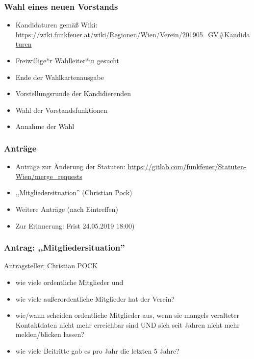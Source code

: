 \documentclass[17pt]{beamer}
\begin{document}
\begin{frame}
	\frametitle{Wahl eines neuen Vorstands}
	\begin{itemize}
		\item Kandidaturen gemäß Wiki: \url{https://wiki.funkfeuer.at/wiki/Regionen/Wien/Verein/201905_GV\#Kandidaturen}
		\item Freiwillige*r Wahlleiter*in gesucht
		\item Ende der Wahlkartenausgabe
		\item Vorstellungsrunde der Kandidierenden
		\item Wahl der Vorstandsfunktionen
		\item Annahme der Wahl
	\end{itemize}
\end{frame}



\begin{frame}
	\frametitle{Anträge}
	\begin{itemize}
		\item Anträge zur Änderung der Statuten: \url{https://gitlab.com/funkfeuer/Statuten-Wien/merge_requests
}
		\item ,,Mitgliedersituation'' (Christian Pock)
		\item Weitere Anträge (nach Eintreffen)
		\item Zur Erinnerung: Frist 24.05.2019 18:00)
	\end{itemize}
\end{frame}



\begin{frame}
	\frametitle{Antrag: ,,Mitgliedersituation''}
	Antragsteller: Christian POCK
	\small{
	\begin{itemize}
		\item wie viele ordentliche Mitglieder und
		\item wie viele außerordentliche Mitglieder hat der Verein?
		\item wie/wann scheiden ordentliche Mitglieder aus, wenn sie mangels veralteter Kontaktdaten nicht mehr erreichbar sind UND sich seit Jahren nicht mehr melden/blicken lassen?
		\item wie viele Beitritte gab es pro Jahr die letzten 5 Jahre?
	\end{itemize}
	}
\end{frame}
\end{document}
